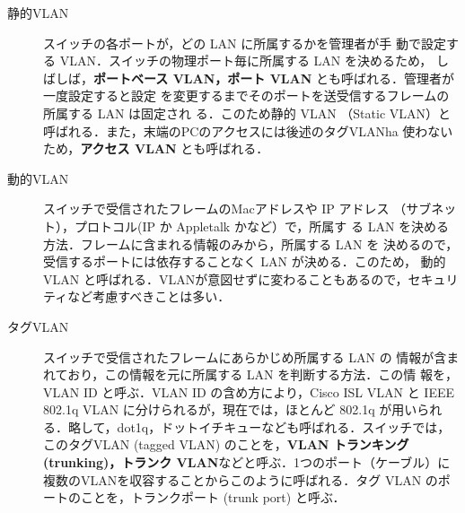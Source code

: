 \begin{description}
\item[静的VLAN] スイッチの各ポートが，どの LAN に所属するかを管理者が手
  動で設定する VLAN．スイッチの物理ポート毎に所属する LAN を決めるため，
  しばしば，\textbf{ポートベース VLAN，ポート VLAN} とも呼ばれる．管理者が一度設定すると設定
  を変更するまでそのポートを送受信するフレームの所属する LAN は固定され
  る．このため静的 VLAN （Static VLAN）と呼ばれる．また，末端のPCのアクセスには後述のタグVLANha
  使わないため，\textbf{アクセス VLAN} とも呼ばれる．

\item[動的VLAN] スイッチで受信されたフレームのMacアドレスや IP アドレス
  （サブネット），プロトコル(IP か Appletalk かなど）で，所属す
  る LAN を決める方法．フレームに含まれる情報のみから，所属する LAN を
  決めるので，受信するポートには依存することなく LAN が決める．このため，
  動的 VLAN と呼ばれる．VLANが意図せずに変わることもあるので，セキュリティなど考慮すべきことは多い．

\item[タグVLAN] スイッチで受信されたフレームにあらかじめ所属する LAN の
  情報が含まれており，この情報を元に所属する LAN を判断する方法．この情
  報を，VLAN ID と呼ぶ．VLAN ID の含め方により，Cisco ISL VLAN と IEEE
  802.1q VLAN に分けられるが，現在では，ほとんど 802.1q が用いられる．略して，dot1q，ドットイチキューなども呼ばれる．スイッチでは，このタグVLAN (tagged VLAN) のことを，\textbf{VLAN トランキング (trunking)，トランク VLAN}などと呼ぶ．1つのポート（ケーブル）に複数のVLANを収容することからこのように呼ばれる．タグ VLAN のポートのことを，トランクポート (trunk port) と呼ぶ．


\end{description}


